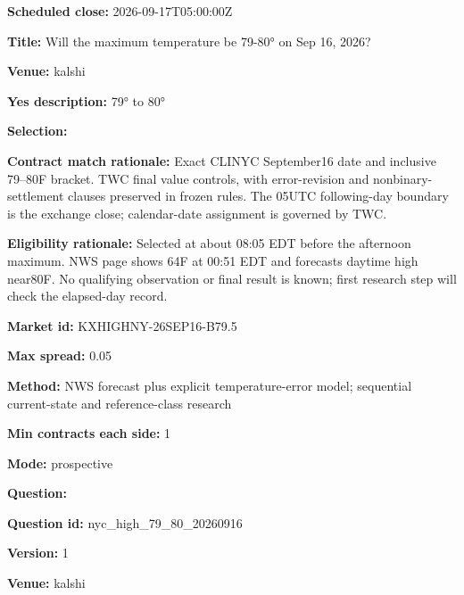 \documentclass[11pt]{article}
\begin{document}
\par\noindent\textbf{Scheduled close:} 2026-09-17T05:00:00Z

\par\noindent\textbf{Title:} Will the maximum temperature be 79-80° on Sep 16, 2026?

\par\noindent\textbf{Venue:} kalshi

\par\noindent\textbf{Yes description:} 79° to 80°

\par\noindent\textbf{Selection:} \par \par\noindent\textbf{Contract match rationale:} Exact CLINYC September16 date and inclusive 79–80F bracket. TWC final value controls, with error-revision and nonbinary-settlement clauses preserved in frozen rules. The 05UTC following-day boundary is the exchange close; calendar-date assignment is governed by TWC.

\par\noindent\textbf{Eligibility rationale:} Selected at about 08:05 EDT before the afternoon maximum. NWS page shows 64F at 00:51 EDT and forecasts daytime high near80F. No qualifying observation or final result is known; first research step will check the elapsed-day record.

\par\noindent\textbf{Market id:} KXHIGHNY-26SEP16-B79.5

\par\noindent\textbf{Max spread:} 0.05

\par\noindent\textbf{Method:} NWS forecast plus explicit temperature-error model; sequential current-state and reference-class research

\par\noindent\textbf{Min contracts each side:} 1

\par\noindent\textbf{Mode:} prospective

\par\noindent\textbf{Question:} \par \par\noindent\textbf{Question id:} nyc\_high\_79\_80\_20260916

\par\noindent\textbf{Version:} 1

\par\noindent\textbf{Venue:} kalshi
\end{document}
